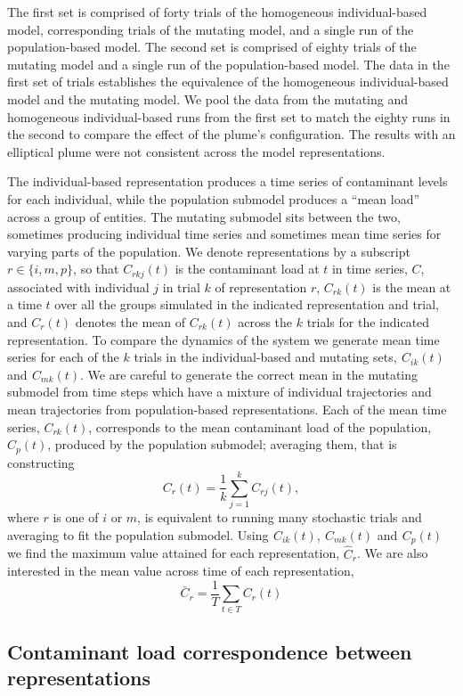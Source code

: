 The first set is comprised of forty trials of the homogeneous individual-based
model, corresponding trials of the mutating model, and a single run of the
population-based model. The second set is comprised of eighty trials of the
mutating model and a single run of the population-based model. The data in the
first set of trials establishes the equivalence of the homogeneous
individual-based model and the mutating model. We pool the data from the
mutating and homogeneous individual-based runs from the first set to match the
eighty runs in the second to compare the effect of the plume's configuration.
The results with an elliptical plume were not consistent across the model
representations.

The individual-based representation produces a time series of
contaminant levels for each individual, while the population submodel
produces a ``mean load'' across a group of entities. The mutating
submodel sits between the two, sometimes producing individual time
series and sometimes mean time series for varying parts of the
population. We denote representations by a subscript $r \in \{i, m,
p\}$, so that $C_{r k j} (t)$ is the contaminant load at $t$ in time
series, $C$, associated with individual $j$ in trial $k$ of
representation $r$, $C_{r k} (t)$ is the mean at a time $t$ over all the
groups simulated in the indicated representation and trial, and $C_r (t)$
denotes the mean of $C_{r k} (t)$ across the $k$ trials for the indicated
representation. To compare the dynamics of the system we generate mean
time series for each of the $k$ trials in the individual-based and
mutating sets, $^{} C_{i k} (t)$ and $^{} C_{m k} (t)$. We are careful to
generate the correct mean in the mutating submodel from time steps
which have a mixture of individual trajectories and mean trajectories
from population-based representations. Each of the mean time series,
$C_{r k} (t)$, corresponds to the mean contaminant load of the
population, $C_p (t)$, produced by the population submodel; averaging
them, that is constructing
\[ C_r (t) = \frac{1}{k} \sum^k_{j = 1} C_{r j} (t), \]
where $r$ is one of $i$ or $m$, is equivalent to running many
stochastic trials and averaging to fit the population submodel. Using
$^{} C_{i k} (t)$, $^{} C_{m k} (t)$ and $^{} C_p (t)$ we find the
maximum value attained for each representation, $\hat{C}_r$. We are
also interested in the mean value across time of each representation,
\[ {\bar{C}}_r = \frac{1}{T} \sum_{t \in T} C_r (t) \]


\subsection{Contaminant load correspondence between
representations}\label{Correspondence}



